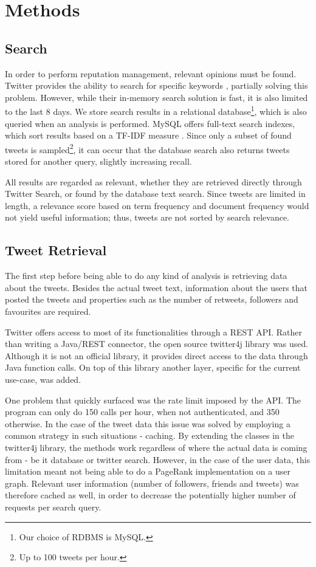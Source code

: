 
\section{Methods}             %
\subsection{Search}     %
In order to perform reputation management, relevant opinions must be found. Twitter provides the ability to search for specific keywords \cite{Golovchinsky_makingsense}, partially solving this problem. However, while their in-memory search solution is fast, it is also limited to the last 8 days. We store search results in a relational database\footnote{Our choice of RDBMS is MySQL.}, which is also queried when an analysis is performed. MySQL offers full-text search indexes, which sort results based on a TF-IDF measure \cite{suchal2010full}. Since only a subset of found tweets is sampled\footnote{Up to 100 tweets per hour.}, it can occur that the database search also returns tweets stored for another query, slightly increasing recall.

All results are regarded as relevant, whether they are retrieved directly through Twitter Search, or found by the database text search. Since tweets are limited in length, a relevance score based on term frequency and document frequency would not yield useful information; thus, tweets are not sorted by search relevance.


\subsection{Tweet Retrieval}	%
The first step before being able to do any kind of analysis is retrieving data about the tweets. Besides the actual tweet text, information about the users that posted the tweets and properties such as the number of retweets, followers and favourites are required.

Twitter offers access to most of its functionalities through a REST API. Rather than writing a Java/REST connector, the open source twitter4j library was used. Although it is not an official library, it provides direct access to the data through Java function calls. On top of this library another layer, specific for the current use-case, was added.

One problem that quickly surfaced was the rate limit imposed by the API. The program can only do 150 calls per hour, when not authenticated, and 350 otherwise. In the case of the tweet data this issue was solved by employing a common strategy in such situations - caching. By extending the classes in the twitter4j library, the methods work regardless of where the actual data is coming from - be it database or twitter search. However, in the case of the user data, this limitation meant not being able to do a PageRank implementation on a user graph. Relevant user information (number of followers, friends and tweets) was therefore cached as well, in order to decrease the potentially higher number of requests per search query.

